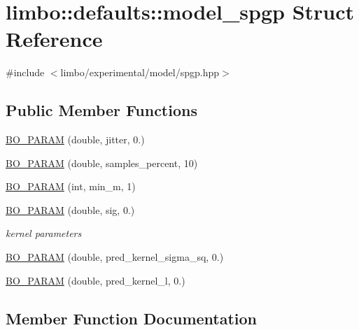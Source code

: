 \hypertarget{structlimbo_1_1defaults_1_1model__spgp}{}\section{limbo\+:\+:defaults\+:\+:model\+\_\+spgp Struct Reference}
\label{structlimbo_1_1defaults_1_1model__spgp}


{\ttfamily \#include $<$limbo/experimental/model/spgp.\+hpp$>$}

\subsection*{Public Member Functions}
\begin{DoxyCompactItemize}
\item 
\hyperlink{structlimbo_1_1defaults_1_1model__spgp_a233526d7737f28a5fb21d30dfc97b88a}{B\+O\+\_\+\+P\+A\+R\+AM} (double, jitter, 0.)
\item 
\hyperlink{structlimbo_1_1defaults_1_1model__spgp_a596e9fd2900c89e3cb853e376ef330df}{B\+O\+\_\+\+P\+A\+R\+AM} (double, samples\+\_\+percent, 10)
\item 
\hyperlink{structlimbo_1_1defaults_1_1model__spgp_aca6ad6e862138f56f81c4ba2670a96a5}{B\+O\+\_\+\+P\+A\+R\+AM} (int, min\+\_\+m, 1)
\item 
\hyperlink{structlimbo_1_1defaults_1_1model__spgp_a61fc726411e68ac66133caa81da1ab32}{B\+O\+\_\+\+P\+A\+R\+AM} (double, sig, 0.)
\begin{DoxyCompactList}\small\item\em kernel parameters \end{DoxyCompactList}\item 
\hyperlink{structlimbo_1_1defaults_1_1model__spgp_a5fb4bbd324231c8860e8a3bfccea9c64}{B\+O\+\_\+\+P\+A\+R\+AM} (double, pred\+\_\+kernel\+\_\+sigma\+\_\+sq, 0.)
\item 
\hyperlink{structlimbo_1_1defaults_1_1model__spgp_a69f03332d95f9c38f890cf604518e290}{B\+O\+\_\+\+P\+A\+R\+AM} (double, pred\+\_\+kernel\+\_\+l, 0.)
\end{DoxyCompactItemize}


\subsection{Member Function Documentation}
